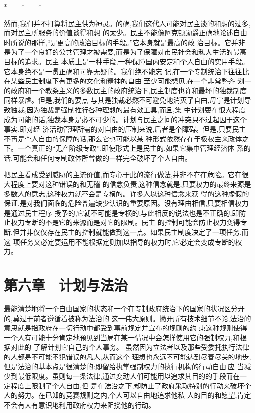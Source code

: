 ﻿\documentclass[12pt]{article}
\begin{document}
*　　*　　*

然而,我们并不打算将民主供为神灵。的确,我们这代人可能对民主谈的和想的过多,而对民主所服务的价值谈得和想
的太少。民主不能像阿克顿勋爵正确地论述自由时所说的那样,``是更高的政治目标的手段。''它本身就是最高的政
治目标。它并非是为了一个良好的公共管理才被需要,而是为了保障对市民社会和私人生活的最高目标的追求。民主
本质上是一种手段,一种保障国内安定和个人自由的实用手段。它本身绝不是一贯正确和可靠无疑的。我们绝不能忘
记,在一个专制统治下往往比在某些民主制度下有更多的文化和精神的自由 \myrule 至少可能想见,在一个非常整齐
划一的政府和一个教条主义的多数民主的政府统治下,民主制度也许和最坏的独裁制度同样暴虐。但是,我们的要点
与其是独裁必然不可避免地消灭了自由,毋宁是计划导致独裁,因为独裁是强制推行各种理想的最有效工具,而且,集
中计划要在很大程度成为可能的话,独裁本身是必不可少的。计划与民主之间的冲突只不过起因于这个事实,即对经
济活动管理所需的对自由的压制来说,后者是个障碍。但是,只要民主不再是个人自由的保障的话,那么它也可能以某
种形式依然存在于极权主义政体之下。一个真正的``无产阶级专政'',即使形式上是民主的,如果它集中管理经济体
系的话,可能会和任何专制政体所曾做的一样完全破坏了个人自由。

把民主看成受到威胁的主流价值,而专心于此的流行做法,并非不存在危险。它在很大程度上要对这种错误的和无稽
的信念负责,这种信念就是,只要权力的最终来源是多数人的意志,这种权力就不会是专横的。许多人以这种信念来获
得的这种虚假的保证,是对我们面临的危险普遍缺少认识的重要原因。没有理由相信,只要相信权力是通过民主程序
授予的,它就不可能是专横的;与此相反的说法也是不正确的,即防止权力专断的不是它的来源而是对它的限制。民主
的控制可能会防止权力变得专断,但并非仅仅存在民主的控制就能做到这一点。如果民主制度决定了一项任务,而这
项任务又必定要运用不能根据定则加以指导的权力时,它必定会变成专断的权力。



\section{第六章　计划与法治}


最能清楚地将一个自由国家的状态和一个在专制政府统治下的国家的状况区分开的,莫过于前者遵循着被称为法治的
这一伟大原则。撇开所有技术细节不论,法治的意思就是指政府在一切行动中都受到事前规定并宣布的规则的约
束\myrule 这种规则使得一个人有可能十分肯定地预见到当局在某一情况中会怎样使用它的强制权力,和根据对此的
了解计划它自己的个人事务。 虽然因为立法者以及那些受委托执行法律的人都是不可能不犯错误的凡人,从而这个
理想也永远不可能达到尽善尽美的地步,但是法治的基本点是很清楚的:即留给执掌强制权力的执行机构的行动自由,应
当减少到最低限度。虽则每一条法律,通过变动人们可能用以追求其目的的手段而在一定程度上限制了个人自由,但
是在法治之下,却防止了政府采取特别的行动来破坏个人的努力。在已知的竞赛规则之内,个人可以自由地追求他私
人的目的和愿望,肯定不会有人有意识地利用政府权力来阻挠他的行动。
\end{document}
